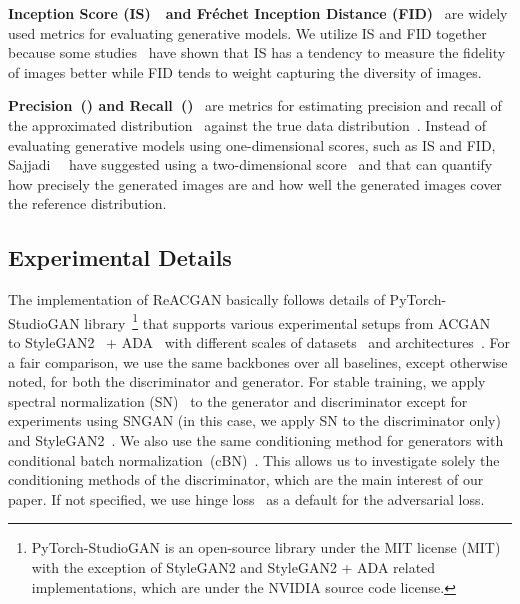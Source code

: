 \documentclass{article}
\begin{document}
\textbf{Inception Score (IS)}~\cite{Salimans2016ImprovedTF}\textbf{~and Fr\'echet Inception Distance (FID)}~\cite{Heusel2017GANsTB} are widely used metrics for evaluating generative models. We utilize IS and FID together because some studies~\cite{Brock2019LargeSG, Wu2019LOGANLO, zhou2020omni} have shown that IS has a tendency to measure the fidelity of images better while FID tends to weight capturing the diversity of images.

\textbf{Precision~() and Recall~()}~\cite{sajjadi2018assessing} are metrics for estimating precision and recall of the approximated distribution~ against the true data distribution~. Instead of evaluating generative models using one-dimensional scores, such as IS and FID, Sajjadi~\etal~\cite{sajjadi2018assessing} have suggested using a two-dimensional score~ and  that can quantify how precisely the generated images are and how well the generated images cover the reference distribution.

\subsection{Experimental Details}
\label{sec:experimental_details}
The implementation of ReACGAN basically follows details of PyTorch-StudioGAN library~\cite{studiogan}\footnote{PyTorch-StudioGAN is an open-source library under the MIT license (MIT) with the exception of StyleGAN2 and StyleGAN2 + ADA related implementations, which are under the NVIDIA source code license.} that supports various experimental setups from ACGAN~\cite{Odena2017ConditionalIS} to StyleGAN2~\cite{karras2020analyzing} + ADA~\cite{Karras2020TrainingGA} with different scales of datasets~\cite{Krizhevsky2009LearningML, Tiny, WelinderEtal2010, Deng2009ImageNetAL, choi2020starganv2} and architectures~\cite{Radford2016UnsupervisedRL, Gulrajani2017ImprovedTO, Brock2019LargeSG, karras2020analyzing}. For a fair comparison, we use the same backbones over all baselines, except otherwise noted, for both the discriminator and generator. For stable training, we apply spectral normalization (SN)~\cite{Miyato2018SpectralNF} to the generator and discriminator except for experiments using SNGAN (in this case, we apply SN to the discriminator only) and StyleGAN2~\cite{karras2020analyzing}. We also use the same conditioning method for generators with conditional batch normalization~(cBN)~\cite{Dumoulin2017ALR, de_Vries, Miyato2018cGANsWP}. This allows us to investigate solely the conditioning methods of the discriminator, which are the main interest of our paper. If not specified, we use hinge loss~\cite{Lim2017GeometricG} as a default for the adversarial loss.
\end{document}
